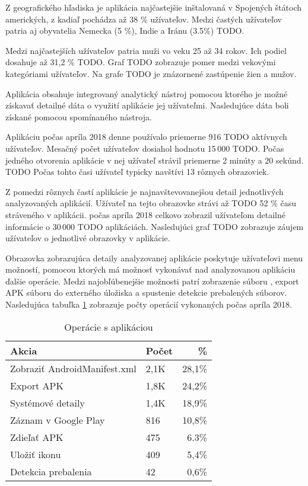 Z geografického hľadiska je aplikácia najčastejšie inštalovaná v Spojených štátoch amerických, z kadiaľ pochádza až 38 \% užívateľov. Medzi častých užívateľov patria aj obyvatelia Nemecka (5 \%), Indie a Iránu (3.5\%) TODO. 

Medzi najčastejších užívateľov patria muži vo veku 25 až 34 rokov. Ich podiel dosahuje až 31,2 \% TODO. Graf TODO zobrazuje pomer medzi vekovými kategóriami užívateľov. Na grafe TODO je znázornené zastúpenie žien a mužov.

Aplikácia obsahuje integrovaný analytický nástroj  pomocou ktorého je možné získavať detailné dáta o využití aplikácie jej užívateľmi. Nasledujúce dáta boli získané pomocou spomínaného nástroja.

Aplikáciu počas apríla 2018 denne používalo priemerne 916 TODO aktívnych užívateľov. Mesačný počet užívateľov dosiahol hodnotu 15\,000 TODO. Počas jedného otvorenia aplikácie v nej užívateľ strávil priemerne 2 minúty a 20 sekúnd. TODO Počas tohto časi užívateľ typicky navštívi 13 rôznych obrazoviek. 

Z pomedzi rôznych častí aplikácie je najnavštevovanejšou detail jednotlivých analyzovaných aplikácií. Užívateľ na tejto obrazovke strávi až TODO 52 \% času stráveného v aplikácii.  počas apríla 2018 celkovo zobrazil užívateľom detailné informácie o 30\,000 TODO aplikáciách.  Nasledujúci graf TODO zobrazuje záujem užívateľov o jednotlivé obrazovky v aplikácie.

Obrazovka zobrazujúca detaily analyzovanej aplikácie poskytuje užívateľovi menu možností, pomocou ktorých má možnosť vykonávať nad analyzovanou aplikáciu ďalšie operácie. Medzi najobľúbenejšie možnosti patrí zobrazenie súboru , export APK súboru do externého úložiska a spustenie detekcie prebalených súborov.  Nasledujúca tabuľka \ref{app-ops} zobrazuje počty operácií vykonaných počas apríla 2018.

\begin{table}[]
\centering
\begin{tabular}{|l|l|r|}
\hline
\textbf{Akcia}                        & \textbf{Počet} & \textbf{\%}    \\ \hline
Zobraziť AndroidManifest.xml & 2,1K  & 28,1\% \\
Export APK                   & 1,8K  & 24,2\% \\
Systémové detaily            & 1,4K  & 18,9\% \\
Záznam v Google Play         & 816   & 10,8\% \\
Zdieľať APK                  & 475   & 6.3\%  \\
Uložiť ikonu                 & 409   & 5,4\%  \\
Detekcia prebalenia          & 42    & 0,6\%  \\ \hline
\end{tabular}
\caption{Operácie s aplikáciou}
\label{app-ops}
\end{table}



